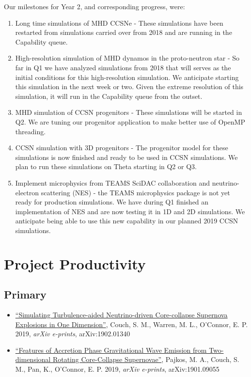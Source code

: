 \documentclass[12pt,titlepage]{article}
\begin{document}
Our milestones for Year 2, and corresponding progress, were:
\begin{enumerate}
    \item Long time simulations of MHD CCSNe - These simulations have been restarted from simulations carried over from 2018 and are running in the Capability queue.
    \item High-resolution simulation of MHD dynamos in the proto-neutron star - So far in Q1 we have analyzed simulations from 2018 that will serves as the initial conditions for this high-resolution simulation. We anticipate starting this simulation in the next week or two. Given the extreme resolution of this simulation, it will run in the Capability queue from the outset.
    \item MHD simulation of CCSN progenitors - These simulations will be started in Q2. We are tuning our progenitor application to make better use of OpenMP threading.
    \item CCSN simulation with 3D progenitors - The progenitor model for these simulations is now finished and ready to be used in CCSN simulations. We plan to run these simulations on Theta starting in Q2 or Q3.
    \item Implement microphysics from TEAMS SciDAC collaboration and neutrino-electron scattering (NES) - the TEAMS microphysics package is not yet ready for production simulations. We have during Q1 finished an implementation of NES and are now testing it in 1D and 2D simulations. We anticipate being able to use this new capability in our planned 2019 CCSN simulations. 
\end{enumerate}



\section{Project Productivity}

\subsection{Primary}

\begin{itemize}
    \item \href{https://ui.adsabs.harvard.edu/#abs/2019arXiv190201340C/abstract}{``Simulating Turbulence-aided Neutrino-driven Core-collapse Supernova Explosions in One Dimension''}, Couch, S. M., Warren, M. L., O'Connor, E. P. 2019, {\itshape arXiv e-prints}, arXiv:1902.01340 
    \item \href{https://ui.adsabs.harvard.edu/#abs/2019arXiv190109055P/abstract}{``Features of Accretion Phase Gravitational Wave Emission from Two-dimensional Rotating Core-Collapse Supernovae''}, Pajkos, M. A., Couch, S. M., Pan, K., O'Connor, E. P. 2019, {\itshape arXiv e-prints}, arXiv:1901.09055 
\end{itemize}
\end{document}
